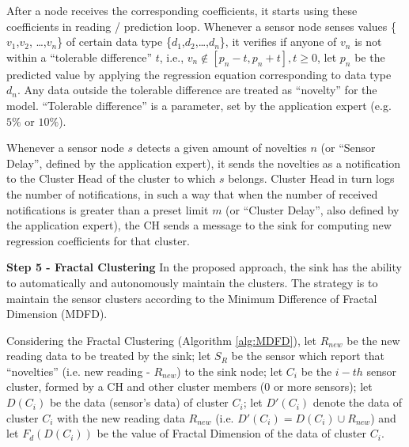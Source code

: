 \documentclass{acm_proc_article-sp}
\begin{document}
After a node receives the corresponding coefficients, it starts using these
coefficients in reading / prediction loop.
Whenever a sensor node senses values \{$v_{1}$,$v_{2}$, \ldots,$v_{n}$\} of
certain data type \{$d_{1}$,$d_{2}$,\ldots,$d_{n}$\}, it verifies if anyone of
$v_{n}$ is not within a ``tolerable difference'' $t$, i.e., $v_{n} \not \in
[p_{n}-t,p_{n}+t], t \geq 0$, let $p_{n}$ be the predicted value by applying
the regression equation corresponding to data type $d_{n}$. Any data outside the
tolerable difference are treated as ``novelty'' for the model.
``Tolerable difference'' is a parameter, set by the application expert (e.g.
$5\%$ or $10\%$).
\vspace*{-.3cm}

Whenever a sensor node $s$ detects a given amount of novelties $n$ (or ``Sensor
Delay'', defined by the application expert), it sends the novelties as a
notification to the Cluster Head of the cluster to which $s$ belongs. 
Cluster Head in turn logs the number of notifications, in such a way that when
the number of received notifications is greater than a preset limit $m$ (or
``Cluster Delay'', also defined by the application expert), the CH sends a
message to the sink for computing new regression coefficients for that cluster.
\vspace*{-.3cm}

{\bf Step 5 - Fractal Clustering}
In the proposed approach, the sink has the ability to automatically and
autonomously maintain the clusters. The strategy is to maintain the sensor
clusters according to the Minimum Difference of Fractal Dimension (MDFD).
\vspace*{-.3cm}

Considering the Fractal Clustering (Algorithm \ref{alg:MDFD}), let $R_{new}$ be
the new reading data to be treated by the sink; let $S_{R}$ be the sensor which
report that ``novelties'' (i.e. new reading - $R_{new}$) to the sink node; let
$C_i$ be the $i-th$ sensor cluster, formed by a CH and other cluster members (0
or more sensors); let $D(C_i)$ be the data (sensor's data) of cluster $C_i$; let
$D'(C_i)$ denote the data of cluster $C_i$ with the new reading data $R_{new}$
(i.e. $D'(C_i) = D(C_i) \cup R_{new}$) and let $F_{d}(D(C_i))$ be the value of
Fractal Dimension of the data of cluster $C_i$.
\vspace*{-.6cm}
\end{document}
